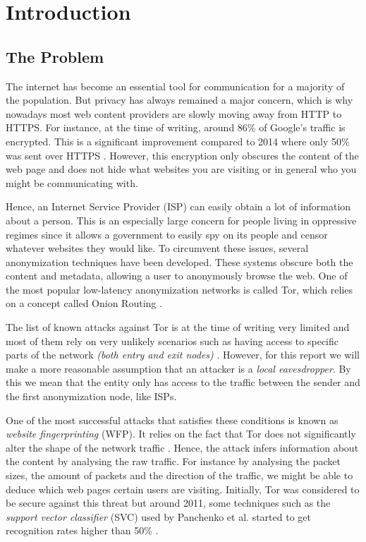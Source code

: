\section{Introduction}

\subsection{The Problem}

The internet has become an essential tool for communication for a majority of the population. But privacy has always remained a major concern,
which is why nowadays most web content providers are slowly moving away from HTTP to HTTPS.
For instance, at the time of writing, around 86\% of Google’s traffic is encrypted. This is a significant improvement compared to 2014 where only 50\%
was sent over HTTPS \cite{google_transparancy}. However, this encryption only obscures the content of the web page and does not
hide what websites you are visiting or in general who you might be communicating with.

Hence, an Internet Service Provider (ISP) can easily obtain a lot of information about a person.
This is an especially large concern for people living in oppressive regimes since it allows a government to easily spy on its people and
censor whatever websites they would like. To circumvent these issues, several anonymization techniques have been developed.
These systems obscure both the content and metadata, allowing a user to anonymously browse the web. One of the most popular low-latency anonymization
networks is called Tor, which relies on a concept called Onion Routing \cite{tor_project}.

The list of known attacks against Tor is at the time of writing very limited and most of them rely on very
unlikely scenarios such as having access to specific parts of the network \textit{(both entry and exit nodes)} \cite{tor_project}.
However, for this report we will make a more reasonable assumption that an attacker is a \textit{local eavesdropper}.
By this we mean that the entity only has access to the traffic between the sender and the first anonymization node, like ISPs.

One of the most successful attacks that satisfies these conditions is known as \textit{website fingerprinting} (WFP).
It relies on the fact that Tor does not significantly alter the shape of the network traffic \cite{kfingerprinting}.
Hence, the attack infers information about the content by analysing the raw traffic.
For instance by analysing the packet sizes, the amount of packets and the direction of the traffic, we might be able to deduce
which web pages certain users are visiting.
Initially, Tor was considered to be secure against this threat but around 2011, some techniques such as the \textit{support vector classifier} (SVC)
used by Panchenko et al. started to get recognition rates higher than 50\% \cite{panchenko1}.

